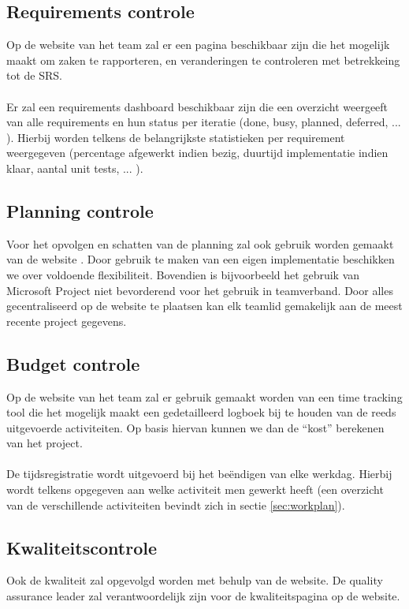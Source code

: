 \subsection{Requirements controle} \label{RequirementsControlPlan}
Op de website van het team \cite{portalWebsite} zal er een pagina beschikbaar zijn die het mogelijk maakt om zaken te rapporteren, en veranderingen te controleren met betrekkeing tot de SRS.
\\
\\
Er zal een requirements dashboard beschikbaar zijn die een overzicht weergeeft van alle requirements en hun status per iteratie (done, busy, planned, deferred, ... ). Hierbij worden telkens de belangrijkste statistieken per requirement weergegeven (percentage afgewerkt indien bezig, duurtijd implementatie indien klaar, aantal unit tests, ... ).

\subsection{Planning controle}
Voor het opvolgen en schatten van de planning zal ook gebruik worden gemaakt van de website \cite{portalWebsite}. Door gebruik te maken van een eigen implementatie beschikken we over voldoende flexibiliteit. Bovendien is bijvoorbeeld het gebruik van Microsoft Project \cite{MicrosoftProject} niet bevorderend voor het gebruik in teamverband. Door alles gecentraliseerd op de website te plaatsen kan elk teamlid gemakelijk aan de meest recente project gegevens.

\subsection{Budget controle}
Op de website van het team \cite{portalWebsite} zal er gebruik gemaakt worden van een time tracking tool die het mogelijk maakt een gedetailleerd logboek bij te houden van de reeds uitgevoerde activiteiten. Op basis hiervan kunnen we dan de ``kost'' berekenen van het project. 
\\
\\
De tijdsregistratie wordt uitgevoerd bij het be\"{e}ndigen van elke werkdag. Hierbij wordt telkens opgegeven aan welke activiteit men gewerkt heeft (een overzicht van de verschillende activiteiten bevindt zich in sectie \ref{sec:workplan}).

\subsection{Kwaliteitscontrole}
Ook de kwaliteit zal opgevolgd worden met behulp van de website. De quality assurance leader zal verantwoordelijk zijn voor de kwaliteitspagina op de website.

